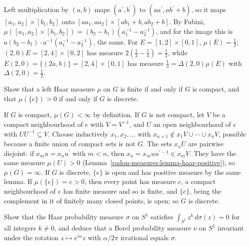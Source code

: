 \begin{solution}
Left multiplication by $(a, b)$ maps $(a^{\prime}, b^{\prime})$ to $(aa^{\prime}, ab^{\prime} + b)$, so it maps $[a_1, a_2] \times [b_1, b_2]$ onto $[aa_1, aa_2] \times [ab_1 + b, ab_2 + b]$. By Fubini,
$\mu([a_1, a_2] \times [b_1, b_2]) = (b_2 - b_1)(a_1^{-1} - a_2^{-1})$, and for the image this is $a(b_2 - b_1)\cdot a^{-1}(a_1^{-1} - a_2^{-1})$, the same. For $E = [1, 2] \times [0, 1]$,
$\mu(E) = \frac12$; $(2, 0)E = [2, 4] \times [0, 2]$ has measure $2(\frac12 - \frac14) = \frac12$, while $E(2, 0) = \{(2a, b)\} = [2, 4] \times [0, 1]$ has measure $\frac14 = \Delta(2, 0)\mu(E)$ with
$\Delta(2, 0) = \frac12$.
\end{solution}

\begin{exercise}\label{radon-measures:exercise-haar-finite}
Show that a left Haar measure $\mu$ on $G$ is finite if and only if $G$ is compact, and that $\mu(\{e\}) > 0$ if and only if $G$ is discrete.
\end{exercise}

\begin{solution}
If $G$ is compact, $\mu(G) < \infty$ by definition. If $G$ is not compact, let $V$ be a compact neighbourhood of $e$ with $V = V^{-1}$, and $U$ an open neighbourhood of $e$ with $UU^{-1} \subseteq V$.
Choose inductively $x_1, x_2, \ldots$ with $x_{n+1} \notin x_1V \cup \cdots \cup x_nV$, possible because a finite union of compact sets is not $G$. The sets $x_nU$ are pairwise disjoint: if $x_mu = x_nu^{\prime}$
with $m < n$, then $x_n = x_muu^{\prime-1} \in x_mV$. They have the same measure $\mu(U) > 0$ (Lemma~\ref{radon-measures:lemma-haar-positive}), so $\mu(G) = \infty$. If $G$ is discrete, $\{e\}$ is open and
has positive measure by the same lemma. If $\mu(\{e\}) = c > 0$, then every point has measure $c$, a compact neighbourhood of $e$ has finite measure and so is finite, and $\{e\}$, being the complement in
it of finitely many closed points, is open; so $G$ is discrete.
\end{solution}

\begin{exercise}\label{radon-measures:exercise-haar-quotient-circle}
Show that the Haar probability measure $\sigma$ on $S^1$ satisfies $\int_{S^1}z^k\,d\sigma(z) = 0$ for all integers $k \neq 0$, and deduce that a Borel probability measure $\nu$ on $S^1$ invariant under the
rotation $z \mapsto e^{i\alpha}z$ with $\alpha/2\pi$ irrational equals $\sigma$.
\end{exercise}


